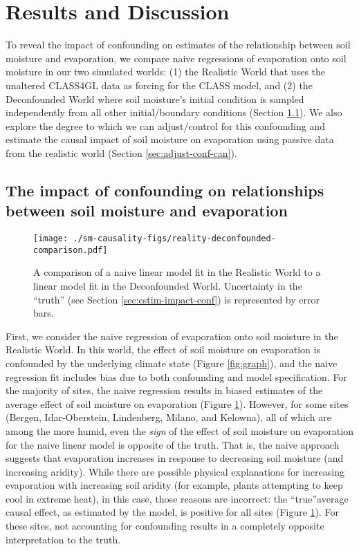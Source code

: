 \documentclass[12pt]{article}
\begin{document}
\section{Results and Discussion}

To reveal the impact of confounding on estimates of the relationship
between soil moisture and evaporation, we compare naive regressions of
evaporation onto soil moisture in our two simulated worlds: (1) the
Realistic World that uses the unaltered CLASS4GL data as forcing for
the CLASS model, and (2) the Deconfounded World where soil moisture's
initial condition is sampled independently from all other
initial/boundary conditions (Section \ref{sec:impact-conf-relat}). We
also explore the degree to which we can adjust/control for this
confounding and estimate the causal impact of soil moisture on
evaporation using passive data from the realistic world (Section
\ref{sec:adjust-conf-can}).

\subsection{The impact of confounding on relationships between soil moisture and evaporation}
\label{sec:impact-conf-relat}

\begin{figure}
  \texttt{[image: ./sm-causality-figs/reality-deconfounded-comparison.pdf]}
  \caption{A comparison of a naive linear model fit in the Realistic
    World to a linear model fit in the Deconfounded World. Uncertainty
    in the ``truth'' (see Section \ref{sec:estim-impact-conf}) is
    represented by error bars.}
\label{fig:reality-deconfounded}
\end{figure}

First, we consider the naive regression of evaporation onto soil
moisture in the Realistic World. In this world, the effect of soil
moisture on evaporation is confounded by the underlying climate state
(Figure \ref{fig:graph}), and the naive regression fit includes bias
due to both confounding and model specification. For the majority of
sites, the naive regression results in biased estimates of the average
effect of soil moisture on evaporation (Figure
\ref{fig:reality-deconfounded}). However, for some sites (Bergen,
Idar-Oberstein, Lindenberg, Milano, and Kelowna), all of which are
among the more humid, even the \textit{sign} of the effect of soil
moisture on evaporation for the naive linear model is opposite of the
truth. That is, the naive approach suggests that evaporation increases
in response to decreasing soil moisture (and increasing
aridity). While there are possible physical explanations for
increasing evaporation with increasing soil aridity (for example,
plants attempting to keep cool in extreme heat\cite{krich2022}), in
this case, those reasons are incorrect: the ``true''average causal
effect, as estimated by the model, is positive for all sites (Figure
\ref{fig:reality-deconfounded}).  For these sites, not accounting for
confounding results in a completely opposite interpretation to the
truth.
\end{document}
